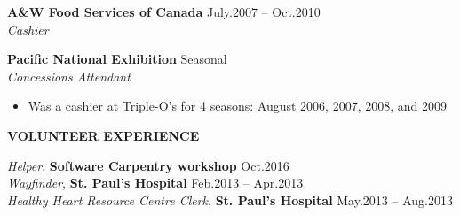 \documentclass{res}
\renewcommand{\section}[1]{%
  \vspace{0.3in}%
  \centerline{\uppercase{\bf{#1}}}%
  \vspace{-6pt}}
\newcommand{\linehead}[2]{%
  {\bf #1} \hfill #2\\}
\newcommand{\linetitle}[1]{%
  {\sl #1}}
\newcommand{\linevolunteer}[3]{%
  {\sl #3}, {\bf #2} \hfill #1\\[.5ex]}
\begin{document}
\begin{resume}
\linehead{A\&W Food Services of Canada}{July.2007 -- Oct.2010}
\linetitle{Cashier}

\linehead{Pacific National Exhibition}{Seasonal}
\linetitle{Concessions Attendant}
\begin{itemize}
  \item Was a cashier at Triple-O's for 4 seasons: August 2006, 2007, 2008, and 2009
\end{itemize}

\section{Volunteer experience}

\linevolunteer{Oct.2016}{%
  Software Carpentry workshop}{%
  Helper}
\linevolunteer{Feb.2013 -- Apr.2013}{%
  St. Paul's Hospital}{%
  Wayfinder}
\linevolunteer{May.2013 -- Aug.2013}{%
  St. Paul's Hospital}{%
  Healthy Heart Resource Centre Clerk}


\end{resume}
\end{document}
